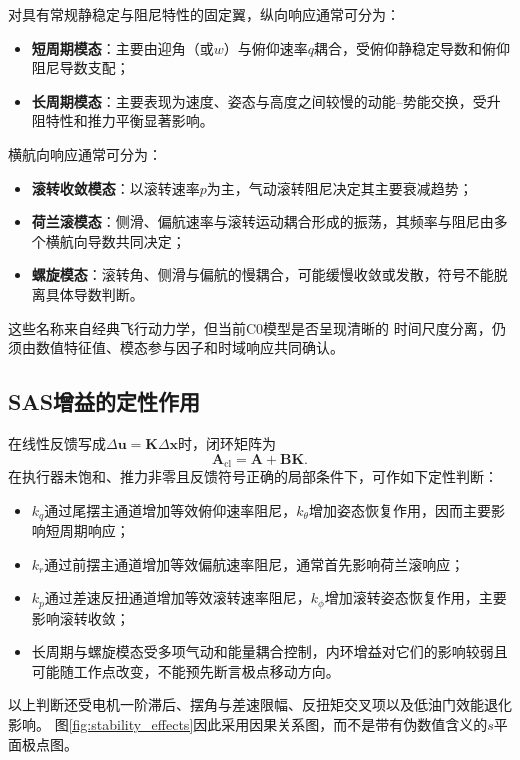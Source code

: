 对具有常规静稳定与阻尼特性的固定翼，纵向响应通常可分为：
\begin{itemize}
    \item \textbf{短周期模态}：主要由迎角（或$w$）与俯仰速率$q$耦合，受俯仰静稳定导数和俯仰阻尼导数支配；
    \item \textbf{长周期模态}：主要表现为速度、姿态与高度之间较慢的动能--势能交换，受升阻特性和推力平衡显著影响。
\end{itemize}
横航向响应通常可分为：
\begin{itemize}
    \item \textbf{滚转收敛模态}：以滚转速率$p$为主，气动滚转阻尼决定其主要衰减趋势；
    \item \textbf{荷兰滚模态}：侧滑、偏航速率与滚转运动耦合形成的振荡，其频率与阻尼由多个横航向导数共同决定；
    \item \textbf{螺旋模态}：滚转角、侧滑与偏航的慢耦合，可能缓慢收敛或发散，符号不能脱离具体导数判断。
\end{itemize}
这些名称来自经典飞行动力学\cite{etkin1982dynamics,stengel2004flight}，但当前C0模型是否呈现清晰的
时间尺度分离，仍须由数值特征值、模态参与因子和时域响应共同确认。

\subsection{SAS增益的定性作用}

在线性反馈写成$\Delta\bm{u}=\bm{K}\Delta\bm{x}$时，闭环矩阵为
\begin{equation}
    \bm{A}_{\mathrm{cl}}=\bm{A}+\bm{B}\bm{K}.
\end{equation}
在执行器未饱和、推力非零且反馈符号正确的局部条件下，可作如下定性判断：
\begin{itemize}
    \item $k_q$通过尾摆主通道增加等效俯仰速率阻尼，$k_\theta$增加姿态恢复作用，因而主要影响短周期响应；
    \item $k_r$通过前摆主通道增加等效偏航速率阻尼，通常首先影响荷兰滚响应；
    \item $k_p$通过差速反扭通道增加等效滚转速率阻尼，$k_\phi$增加滚转姿态恢复作用，主要影响滚转收敛；
    \item 长周期与螺旋模态受多项气动和能量耦合控制，内环增益对它们的影响较弱且可能随工作点改变，不能预先断言极点移动方向。
\end{itemize}
以上判断还受电机一阶滞后、摆角与差速限幅、反扭矩交叉项以及低油门效能退化影响。
图\ref{fig:stability_effects}因此采用因果关系图，而不是带有伪数值含义的$s$平面极点图。

